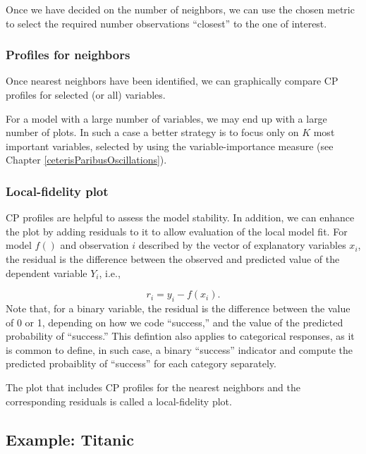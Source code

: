 \documentclass[12pt,]{krantz}
\begin{document}
Once we have decided on the number of neighbors, we can use the chosen metric to select the required number observations ``closest'' to the one of interest.

\hypertarget{cPLocDiagProfiles}{%
\subsubsection{Profiles for neighbors}\label{cPLocDiagProfiles}}

Once nearest neighbors have been identified, we can graphically compare CP profiles for selected (or all) variables.

For a model with a large number of variables, we may end up with a large number of plots. In such a case a better strategy is to focus only on \(K\) most important variables, selected by using the variable-importance measure (see Chapter \ref{ceterisParibusOscillations}).

\hypertarget{cPLocDiagLFplot}{%
\subsubsection{Local-fidelity plot}\label{cPLocDiagLFplot}}

CP profiles are helpful to assess the model stability. In addition, we can enhance the plot by adding residuals to it to allow evaluation of the local model fit. For model \(f()\) and observation \(i\) described by the vector of explanatory variables \(x_i\), the residual is the difference between the observed and predicted value of the dependent variable \(Y_i\), i.e.,

\[
r_i = y_i - f(x_i).
\]
Note that, for a binary variable, the residual is the difference between the value of 0 or 1, depending on how we code ``success,'' and the value of the predicted probability of ``success.'' This defintion also applies to categorical responses, as it is common to define, in such case, a binary ``success'' indicator and compute the predicted probaiblity of ``success'' for each category separately.

The plot that includes CP profiles for the nearest neighbors and the corresponding residuals is called a local-fidelity plot.

\hypertarget{cPLocDiagExample}{%
\subsection{Example: Titanic}\label{cPLocDiagExample}}
\end{document}
